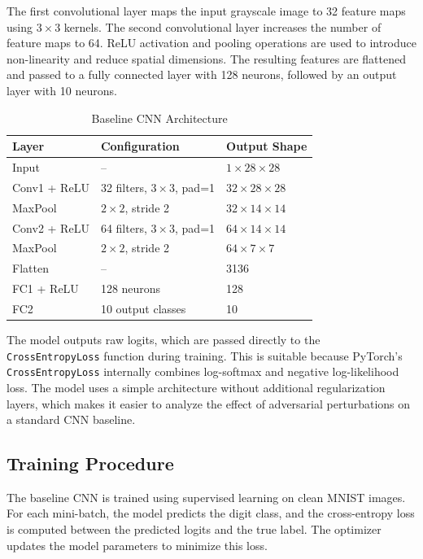 \documentclass[conference,10pt]{IEEEtran}
\begin{document}
The first convolutional layer maps the input grayscale image to 32 feature maps using $3 \times 3$ kernels. The second convolutional layer increases the number of feature maps to 64. ReLU activation and pooling operations are used to introduce non-linearity and reduce spatial dimensions. The resulting features are flattened and passed to a fully connected layer with 128 neurons, followed by an output layer with 10 neurons.

\begin{table}[H]
\caption{Baseline CNN Architecture}
\label{tab:model_architecture}
\centering
\renewcommand{\arraystretch}{1.15}
\begin{tabular}{p{} p{} p{}}
\hline
\textbf{Layer} & \textbf{Configuration} & \textbf{Output Shape} \\
\hline
Input & -- & $1 \times 28 \times 28$ \\
Conv1 + ReLU & 32 filters, $3{\times}3$, pad=1 & $32 \times 28 \times 28$ \\
MaxPool & $2{\times}2$, stride 2 & $32 \times 14 \times 14$ \\
Conv2 + ReLU & 64 filters, $3{\times}3$, pad=1 & $64 \times 14 \times 14$ \\
MaxPool & $2{\times}2$, stride 2 & $64 \times 7 \times 7$ \\
Flatten & -- & 3136 \\
FC1 + ReLU & 128 neurons & 128 \\
FC2 & 10 output classes & 10 \\
\hline
\end{tabular}
\end{table}

The model outputs raw logits, which are passed directly to the \texttt{CrossEntropyLoss} function during training. This is suitable because PyTorch's \texttt{CrossEntropyLoss} internally combines log-softmax and negative log-likelihood loss. The model uses a simple architecture without additional regularization layers, which makes it easier to analyze the effect of adversarial perturbations on a standard CNN baseline.

\subsection{Training Procedure}

The baseline CNN is trained using supervised learning on clean MNIST images. For each mini-batch, the model predicts the digit class, and the cross-entropy loss is computed between the predicted logits and the true label. The optimizer updates the model parameters to minimize this loss.
\end{document}
